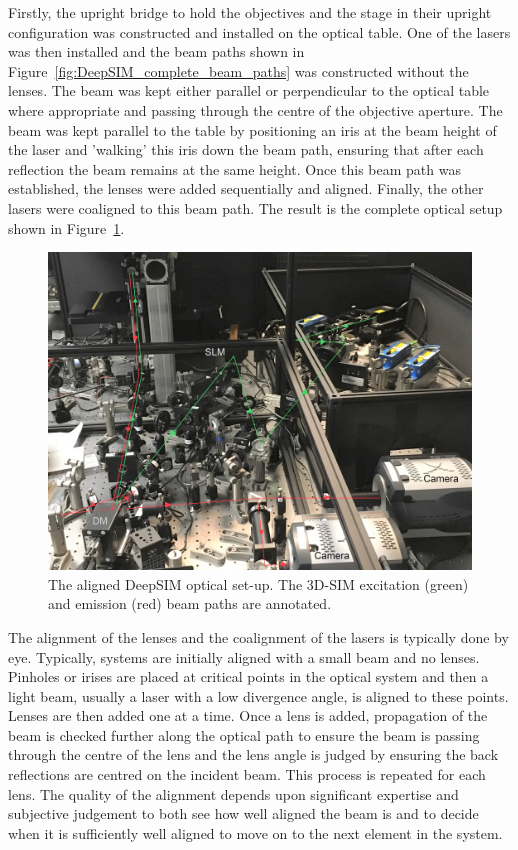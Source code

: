Firstly, the upright bridge to hold the objectives and the stage in their upright configuration was constructed and installed on the optical table. One of the lasers was then installed and the beam paths shown in Figure~\ref{fig:DeepSIM_complete_beam_paths} was constructed without the lenses. The beam was kept either parallel or perpendicular to the optical table where appropriate and passing through the centre of the objective aperture. The beam was kept parallel to the table by positioning an iris at the beam height of the laser and 'walking' this iris down the beam path, ensuring that after each reflection the beam remains at the same height. Once this beam path was established, the lenses were added sequentially and aligned. Finally, the other lasers were coaligned to this beam path. The result is the complete optical setup shown in Figure~\ref{fig:DeepSIM_physical_optics}.

\begin{figure}[h]
	\centering
	\includegraphics[width=\textwidth]{images/DeepSIM_SIM_path_annotated_bright.jpg}
	\caption[The aligned DeepSIM optical set-up.]{The aligned DeepSIM optical set-up. The 3D-SIM excitation (green) and emission (red) beam paths are annotated.}
	\label{fig:DeepSIM_physical_optics}
\end{figure}

The alignment of the lenses and the coalignment of the lasers is typically done by eye.  Typically,
systems are initially aligned with a small beam and no lenses.
Pinholes or irises are placed at critical points in
the optical system and then a light beam, usually a laser with
a low divergence angle, is aligned to these points. Lenses
are then added one at a time. Once a lens is added,
propagation of the beam is checked further along the optical
path to ensure the beam is passing through the centre of the
lens and the lens angle is judged by ensuring the back
reflections are centred on the incident beam. This process is
repeated for each lens. The quality of the alignment
depends upon significant expertise and subjective judgement to
both see how well aligned the beam is and to decide when it is
sufficiently well aligned to move on to the next element in
the system.

